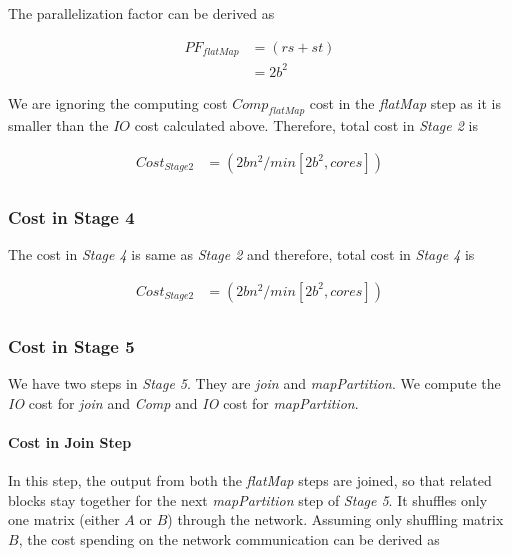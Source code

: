 The parallelization factor can be derived as

\begin{equation}
    \begin{aligned}
        PF_{flatMap}&=(rs+st) \\
        &=2b^{2}
    \end{aligned}
\end{equation}

We are ignoring the computing cost $Comp_{flatMap}$ cost in the \textit{flatMap} step as it is smaller than the $IO$ cost calculated above. Therefore, total cost in \textit{Stage 2} is

\begin{equation}
    \begin{aligned}
        Cost_{Stage 2}&=(2bn^{2}/min[2b^{2}, cores]) \\
    \end{aligned}
\end{equation}

\subsubsection{Cost in Stage 4}
The cost in \textit{Stage 4} is same as \textit{Stage 2} and therefore, total cost in \textit{Stage 4} is

\begin{equation}
    \begin{aligned}
        Cost_{Stage 2}&=(2bn^{2}/min[2b^{2}, cores]) \\
    \end{aligned}
\end{equation}

\subsubsection{Cost in Stage 5}
We have two steps in \textit{Stage 5}. They are \textit{join} and \textit{mapPartition}. We compute the \textit{IO} cost for \textit{join} and \textit{Comp} and \textit{IO} cost for \textit{mapPartition}.

\paragraph{Cost in Join Step}
In this step, the output from both the \textit{flatMap} steps are joined, so that related blocks stay together for the next \textit{mapPartition} step of \textit{Stage 5}. It shuffles only one matrix (either $A$ or $B$) through the network. Assuming only shuffling matrix $B$, the cost spending on the network communication can be derived as

